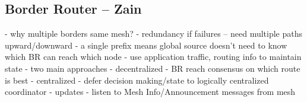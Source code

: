 \subsection{Border Router -- Zain}
\if
- why multiple borders same mesh?
    - redundancy if failures -- need multiple paths upward/downward
    - a single prefix means global source doesn't need to know which BR can reach which node
    - use application traffic, routing info to maintain state
- two main approaches
    - decentralized
        - BR reach consensus on which route is best
    - centralized
        - defer decision making/state to logically centralized coordinator
- updates
    - listen to Mesh Info/Announcement messages from mesh
\fi



